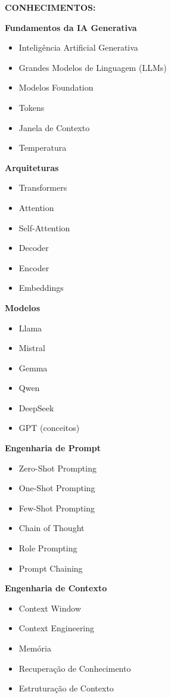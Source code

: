 \textbf{CONHECIMENTOS:}

\textbf{Fundamentos da IA Generativa}

\begin{itemize}
\item Inteligência Artificial Generativa
\item Grandes Modelos de Linguagem (LLMs)
\item Modelos Foundation
\item Tokens
\item Janela de Contexto
\item Temperatura
\end{itemize}

\textbf{Arquiteturas}

\begin{itemize}
\item Transformers
\item Attention
\item Self-Attention
\item Decoder
\item Encoder
\item Embeddings
\end{itemize}

\textbf{Modelos}

\begin{itemize}
\item Llama
\item Mistral
\item Gemma
\item Qwen
\item DeepSeek
\item GPT (conceitos)
\end{itemize}

\textbf{Engenharia de Prompt}

\begin{itemize}
\item Zero-Shot Prompting
\item One-Shot Prompting
\item Few-Shot Prompting
\item Chain of Thought
\item Role Prompting
\item Prompt Chaining
\end{itemize}

\textbf{Engenharia de Contexto}

\begin{itemize}
\item Context Window
\item Context Engineering
\item Memória
\item Recuperação de Conhecimento
\item Estruturação de Contexto
\end{itemize}

